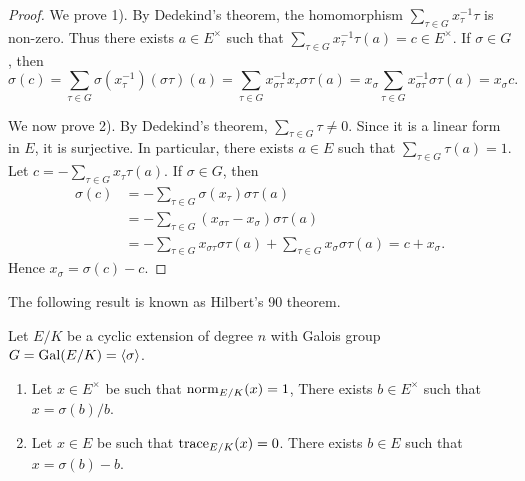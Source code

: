 \begin{proof}
    We prove 1). By Dedekind's theorem, the homomorphism 
    $\sum_{\tau\in G}x_{\tau}^{-1}\tau$ is non-zero. Thus there exists
    $a\in E^{\times}$ such that $\sum_{\tau\in G}x_{\tau}^{-1}\tau(a)=c\in E^{\times}$. 
    If $\sigma\in G$, 
    then 
    \[
    \sigma(c)=\sum_{\tau\in G}\sigma(x_{\tau}^{-1})(\sigma\tau)(a)=
    \sum_{\tau\in G}x_{\sigma\tau}^{-1}x_{\tau}\sigma\tau(a)
    =x_{\sigma}\sum_{\tau\in G}x_{\sigma\tau}^{-1}\sigma\tau(a)=x_{\sigma}c.
    \]
    
    We now prove 2). By Dedekind's theorem, $\sum_{\tau\in G}\tau\ne0$. Since
    it is a linear form in $E$, it is surjective. In particular, there exists 
    $a\in E$ such that $\sum_{\tau\in G}\tau(a)=1$. Let $c=-\sum_{\tau\in G}x_\tau\tau(a)$. 
    If $\sigma\in G$, then 
    \begin{align*}
        \sigma(c) &= -\sum_{\tau\in G}\sigma(x_{\tau})\sigma\tau(a)\\
        &=-\sum_{\tau\in G}(x_{\sigma\tau}-x_{\sigma})\sigma\tau(a)\\
        &=-\sum_{\tau\in G}x_{\sigma\tau}\sigma\tau(a)+\sum_{\tau\in G}x_{\sigma}\sigma\tau(a)
        =c+x_{\sigma}.
    \end{align*}
    Hence $x_{\sigma}=\sigma(c)-c$. 
\end{proof}

The following result is known as Hilbert's 90 theorem. 

\begin{theorem}[Hilbert]
    Let $E/K$ be a cyclic extension of degree $n$ with Galois group $G=\operatorname{Gal}(E/K)=\langle\sigma\rangle$. 
    \begin{enumerate}
        \item Let $x\in E^{\times}$ be such that $\operatorname{norm}_{E/K}(x)=1$, 
        There exists $b\in E^{\times}$ such that $x=\sigma(b)/b$. 
        \item Let  $x\in E$ be such that $\operatorname{trace}_{E/K}(x)=0$. 
        There exists $b\in E$ such that $x=\sigma(b)-b$. 
    \end{enumerate}
\end{theorem}

